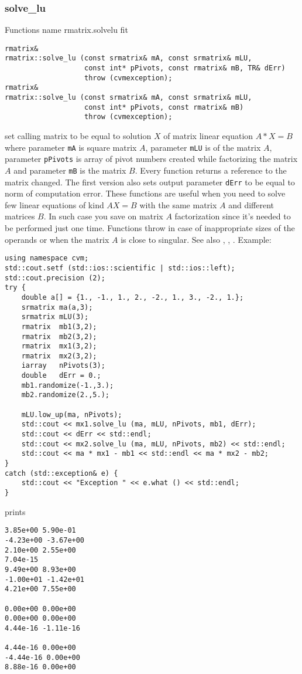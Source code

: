 \subsubsection{solve\_lu}
Functions%
\pdfdest name {rmatrix.solvelu} fit
\begin{verbatim}
rmatrix&
rmatrix::solve_lu (const srmatrix& mA, const srmatrix& mLU,
                   const int* pPivots, const rmatrix& mB, TR& dErr)
                   throw (cvmexception);
rmatrix&
rmatrix::solve_lu (const srmatrix& mA, const srmatrix& mLU,
                   const int* pPivots, const rmatrix& mB)
                   throw (cvmexception);
\end{verbatim}
set  calling matrix to be equal to  solution $X$ of 
matrix linear equation
$A*X=B$ where parameter \verb"mA" is square matrix $A$,
parameter \verb"mLU" is 
of the matrix $A$, parameter \verb"pPivots" is  array of pivot numbers
created while factorizing the matrix $A$
and  parameter \verb"mB" is the matrix $B$.
Every function returns a reference to the matrix changed.
The first version also sets output parameter \verb"dErr" to be equal
to  norm of computation error.
These functions are useful when you need to solve few linear equations
of kind $AX=B$ with the same matrix $A$ and different matrices $B$.
In such case you save on matrix $A$ factorization since it's needed to be
performed just one time.
Functions throw 
in case of inappropriate sizes
of the operands or when the matrix $A$ is close to singular.
See also
,
,
.
Example:
\begin{Verbatim}
using namespace cvm;
std::cout.setf (std::ios::scientific | std::ios::left);
std::cout.precision (2);
try {
    double a[] = {1., -1., 1., 2., -2., 1., 3., -2., 1.};
    srmatrix ma(a,3);
    srmatrix mLU(3);
    rmatrix  mb1(3,2);
    rmatrix  mb2(3,2);
    rmatrix  mx1(3,2);
    rmatrix  mx2(3,2);
    iarray   nPivots(3);
    double   dErr = 0.;
    mb1.randomize(-1.,3.);
    mb2.randomize(2.,5.);

    mLU.low_up(ma, nPivots);
    std::cout << mx1.solve_lu (ma, mLU, nPivots, mb1, dErr);
    std::cout << dErr << std::endl;
    std::cout << mx2.solve_lu (ma, mLU, nPivots, mb2) << std::endl;
    std::cout << ma * mx1 - mb1 << std::endl << ma * mx2 - mb2;
}
catch (std::exception& e) {
    std::cout << "Exception " << e.what () << std::endl;
}
\end{Verbatim}
prints
\begin{Verbatim}
3.85e+00 5.90e-01
-4.23e+00 -3.67e+00
2.10e+00 2.55e+00
7.04e-15
9.49e+00 8.93e+00
-1.00e+01 -1.42e+01
4.21e+00 7.55e+00

0.00e+00 0.00e+00
0.00e+00 0.00e+00
4.44e-16 -1.11e-16

4.44e-16 0.00e+00
-4.44e-16 0.00e+00
8.88e-16 0.00e+00
\end{Verbatim}
\newpage




